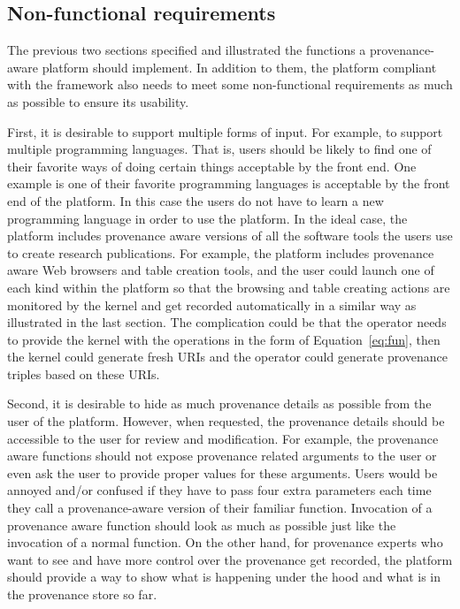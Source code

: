 \subsection{Non-functional requirements}
The previous two sections specified and illustrated the functions a provenance-aware platform should implement. In addition to them, the platform compliant with the framework also needs to meet some non-functional requirements as much as possible to ensure its usability.

First, it is desirable to support multiple forms of input. For example, to support multiple programming languages. That is, users should be likely to find one of their favorite ways of doing certain things acceptable by the front end. One example is one of their favorite programming languages is acceptable by the front end of the platform. In this case the users do not have to learn a new programming language in order to use the platform. In the ideal case, the platform includes provenance aware versions of all the software tools the users use to create research publications. For example, the platform includes provenance aware Web browsers and table creation tools, and the user could launch one of each kind within the platform so that the browsing and table creating actions are monitored by the kernel and get recorded automatically in a similar way as illustrated in the last section. The complication could be that the operator needs to provide the kernel with the operations in the form of Equation~\ref{eq:fun}, then the kernel could generate fresh URIs and the operator could generate provenance triples based on these URIs.

Second, it is desirable to hide as much provenance details as possible from the user of the platform. However, when requested, the provenance details should be accessible to the user for review and modification. For example, the provenance aware functions should not expose provenance related arguments to the user or even ask the user to provide proper values for these arguments. Users would be annoyed and/or confused if they have to pass four extra parameters each time they call a provenance-aware version of their familiar function. Invocation of a provenance aware function should look as much as possible just like the invocation of a normal function. On the other hand, for provenance experts who want to see and have more control over the provenance get recorded, the platform should provide a way to show what is happening under the hood and what is in the provenance store so far.

